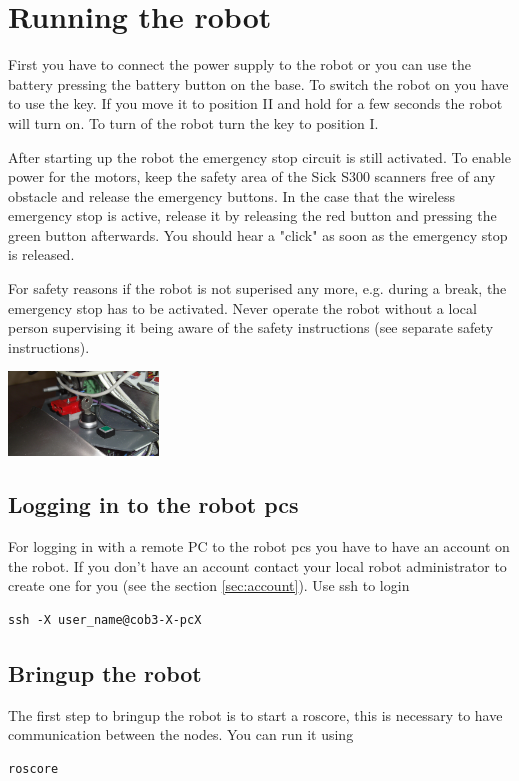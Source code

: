 \section{Running the robot}
First you have to connect the power supply to the robot or you can use the battery pressing the battery button on the base. To switch the robot on you have to use the key. If you move it to position II and hold for a few seconds the robot will turn on. To turn of the robot turn the key to position I. 

After starting up the robot the emergency stop circuit is still activated. To enable power for the motors, keep the safety area of the Sick S300 scanners free of any obstacle and release the emergency buttons. In the case that the wireless emergency stop is active, release it by releasing the red button and pressing the green button afterwards. You should hear a "click" as soon as the emergency stop is released.

For safety reasons if the robot is not superised any more, e.g. during a break, the emergency stop has to be activated. Never operate the robot without a local person supervising it being aware of the safety instructions (see separate safety instructions).

\begin{center}
\includegraphics[width=0.3\textwidth]{images/key.png}
\end{center}


\subsection{Logging in to the robot pcs}
For logging in with a remote PC to the robot pcs you have to have an account on the robot. If you don't have an account contact your local robot administrator to create one for you (see the section \ref{sec:account}). Use ssh to login

\begin{lstlisting}
ssh -X user_name@cob3-X-pcX
\end{lstlisting}

\subsection{Bringup the robot}
The first step to bringup the robot is to start a roscore, this is necessary to have communication between the nodes. You can run it using
\begin{lstlisting}
roscore
\end{lstlisting}

